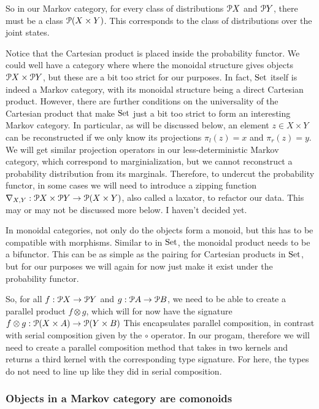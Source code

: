 So in our Markov category, for every class of distributions $\mathcal{P} X$ and $\mathcal{P} Y$, there must be a class $\mathcal{P} (X\times Y)$.
This corresponds to the class of distributions over the joint states.

Notice that the Cartesian product is placed inside the probability functor.
We could well have a category where where the monoidal structure gives objects $\mathcal{P} X \times \mathcal{P} Y$, but these are a bit too strict for our purposes.
In fact, $\mathrm{Set}$ itself is indeed a Markov category, with its monoidal structure being a direct Cartesian product.
However, there are further conditions on the universality of the Cartesian product that make $\mathrm{Set}$ just a bit too strict to form an interesting Markov category.
In particular, as will be discussed below, an element $z\in X\times Y$ can be reconstructed if we only know its projections $\pi_l(z) = x$ and $\pi_r(z) = y$.
We will get similar projection operators in our less-deterministic Markov category, which correspond to marginialization, but we cannot reconstruct a probability distribution from its marginals.
Therefore, to undercut the probability functor, in some cases we will need to introduce a zipping function $\nabla_{X,Y} : \mathcal{P} X\times \mathcal{P} Y\rightarrow \mathcal{P}(X\times Y)$, also called a laxator, to refactor our data.
This may or may not be discussed more below. I haven't decided yet.

In monoidal categories, not only do the objects form a monoid, but this has to be compatible with morphisms.
Similar to in $\mathrm{Set}$, the monoidal product needs to be a bifunctor.
This can be as simple as the pairing for Cartesian products in $\mathrm{Set}$, but for our purposes we will again for now just make it exist under the probability functor.

So, for all $f:\mathcal{P} X \rightarrow \mathcal{P} Y$ and $g: \mathcal{P} A \rightarrow \mathcal{P} B$, we need to be able to create a parallel product $f\otimes g$, which will for now have the signature $f\otimes g : \mathcal{P}(X\times A) \rightarrow \mathcal{P}(Y\times B)$
This encapsulates parallel composition, in contrast with serial composition given by the $\circ$ operator.
In our progam, therefore we will need to create a parallel composition method that takes in two kernels and returns a third kernel with the corresponding type signature.
For here, the types do not need to line up like they did in serial composition.

\subsubsection{Objects in a Markov category are comonoids}

